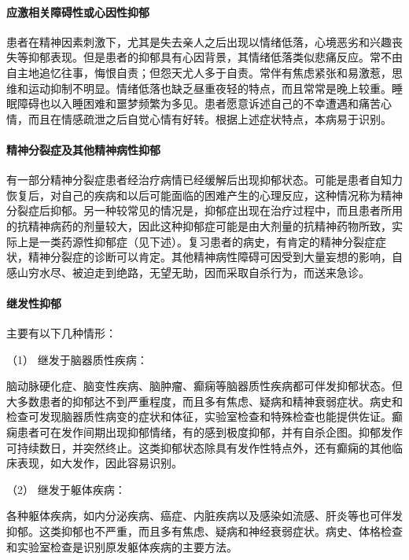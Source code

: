 \paragraph{应激相关障碍性或心因性抑郁}

患者在精神因素刺激下，尤其是失去亲人之后出现以情绪低落，心境恶劣和兴趣丧失等抑郁表现。但是患者的抑郁具有心因背景，其情绪低落类似悲痛反应。常不由自主地追忆往事，悔恨自责；但怨天尤人多于自责。常伴有焦虑紧张和易激惹，思维和运动抑制不明显。情绪低落也缺乏昼重夜轻的特点，而且常常是晚上较重。睡眠障碍也以入睡困难和噩梦频繁为多见。患者愿意诉述自己的不幸遭遇和痛苦心情，而且在情感疏泄之后自觉心情有好转。根据上述症状特点，本病易于识别。

\paragraph{精神分裂症及其他精神病性抑郁}

有一部分精神分裂症患者经治疗病情已经缓解后出现抑郁状态。可能是患者自知力恢复后，对自己的疾病和以后可能面临的困难产生的心理反应，这种情况称为精神分裂症后抑郁。另一种较常见的情况是，抑郁症出现在治疗过程中，而且患者所用的抗精神病药的剂量较大，因此这种抑郁症可能是由大剂量的抗精神药物所致，实际上是一类药源性抑郁症（见下述）。复习患者的病史，有肯定的精神分裂症症状，精神分裂症的诊断可以肯定。其他精神病性障碍可因受到大量妄想的影响，自感山穷水尽、被迫走到绝路，无望无助，因而采取自杀行为，而送来急诊。

\paragraph{继发性抑郁}

主要有以下几种情形：

\hypertarget{text00045.htmlux5cux23CHP1-18-3-2-4-1}{}
（1） 继发于脑器质性疾病：

脑动脉硬化症、脑变性疾病、脑肿瘤、癫痫等脑器质性疾病都可伴发抑郁状态。但大多数患者的抑郁达不到严重程度，而且多有焦虑、疑病和精神衰弱症状。病史和检查可发现脑器质性病变的症状和体征，实验室检查和特殊检查也能提供佐证。癫痫患者可在发作间期出现抑郁情绪，有的感到极度抑郁，并有自杀企图。抑郁发作可持续数日，并突然终止。这类抑郁状态除具有发作性特点外，还有癫痫的其他临床表现，如大发作，因此容易识别。

\hypertarget{text00045.htmlux5cux23CHP1-18-3-2-4-2}{}
（2） 继发于躯体疾病：

各种躯体疾病，如内分泌疾病、癌症、内脏疾病以及感染如流感、肝炎等也可伴发抑郁。这类抑郁也不严重，而且多有焦虑、疑病和神经衰弱症状。病史、体格检查和实验室检查是识别原发躯体疾病的主要方法。

